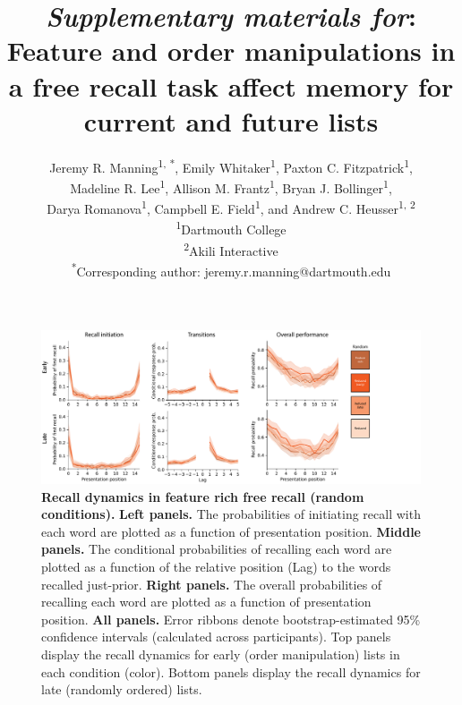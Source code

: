 \documentclass{article}
\title{\textit{Supplementary materials for}: Feature and order manipulations in
a free recall task affect memory for current and future lists}
\author{Jeremy R. Manning\textsuperscript{1, *}, Emily
Whitaker\textsuperscript{1}, Paxton C. Fitzpatrick\textsuperscript{1},
\\Madeline R. Lee\textsuperscript{1}, Allison M. Frantz\textsuperscript{1},
Bryan J. Bollinger\textsuperscript{1},\\Darya Romanova\textsuperscript{1},
Campbell E. Field\textsuperscript{1}, and Andrew C. Heusser\textsuperscript{1,
2}\\\textsuperscript{1}Dartmouth College\\\textsuperscript{2}Akili
Interactive\\\textsuperscript{*}Corresponding author:
jeremy.r.manning@dartmouth.edu}
\date{}
\begin{document}
\renewcommand{\figurename}{Supplementary Figure}


\setcounter{equation}{0}
\setcounter{figure}{0}
\setcounter{table}{0}
\setcounter{page}{1}
\setcounter{section}{0}
\makeatletter
\renewcommand{\theequation}{S\arabic{equation}}
\renewcommand{\thefigure}{S\arabic{figure}}
\renewcommand{\bibnumfmt}[1]{[S#1]}
\renewcommand{\citenumfont}[1]{S#1}

\maketitle

\begin{figure}[p] \centering
\includegraphics[width=\textwidth]{figures/recall_dynamics_random}

\caption{\textbf{Recall dynamics in feature rich free recall (random conditions).} \textbf{Left panels.} The probabilities of
initiating recall with each word are plotted as a function of presentation
position. \textbf{Middle panels.} The conditional probabilities of recalling
each word are plotted as a function of the relative position (Lag) to the words
recalled just-prior. \textbf{Right panels.} The overall probabilities of
recalling each word are plotted as a function of presentation position.
\textbf{All panels.} Error ribbons denote bootstrap-estimated 95\% confidence
intervals (calculated across participants). Top panels display the recall
dynamics for early (order manipulation) lists in each condition (color). Bottom
panels display the recall dynamics for late (randomly ordered) lists.}

    \label{fig:recall-dynamics-random}
\end{figure}
\end{document}
